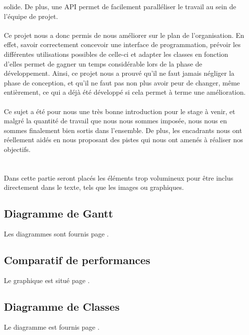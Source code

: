 \documentclass[a4paper]{memoir}
\begin{document}
		solide. De plus, une API permet de facilement paralléliser le travail au sein de l'équipe de projet.\\
		\\
		Ce projet nous a donc permis de nous améliorer sur le plan de l'organisation. En effet, savoir correctement concevoir une interface de programmation,
		prévoir les différentes utilisations possibles de celle-ci et adapter les classes en fonction d'elles permet de gagner un temps considérable lors de 
		la phase de développement. Ainsi, ce projet nous a prouvé qu'il ne faut jamais négliger la phase de conception, et qu'il ne faut pas non plus avoir 
		peur de changer, même entièrement, ce qui a déjà été développé si cela permet à terme une amélioration.\\
		\\
		Ce sujet a été pour nous une très bonne introduction pour le stage à venir, et malgré la quantité de travail que nous nous sommes imposée, nous nous 
		en sommes finalement bien sortis dans l'ensemble. De plus, les encadrants nous ont réellement aidés en nous proposant des pistes qui nous ont amenés 
		à réaliser nos objectifs.
	
	\appendix
	\chapter{}
		Dans cette partie seront placés les éléments trop volumineux pour être inclus directement dans le texte, tels que les images ou graphiques.\\
		
		\section{Diagramme de Gantt}
			Les diagrammes sont fournis page \pageref{fig:gantt}.
			
		\section{Comparatif de performances}
			Le graphique est situé page \pageref{fig:analyse}.
			
		\section{Diagramme de Classes}
			Le diagramme est fournis page \pageref{fig:diagClass}.
			
\end{document}
